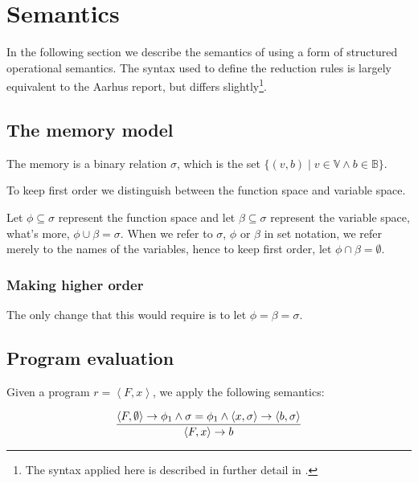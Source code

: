 \section{Semantics}\label{section:d-sos}

In the following section we describe the semantics of \D{} using a form of
structured operational semantics. The syntax used to define the reduction rules
is largely equivalent to the Aarhus report\cite{sos}, but differs
slightly\footnote{The syntax applied here is described in further detail in
.}.

\subsection{The memory model}\label{section:d-semantics-memory}

\begin{definition}\label{definition:memory} The memory is a binary relation
$\sigma$, which is the set $\{(v,b)\mid v\in\mathbb{V} \wedge
b\in\mathbb{B}\}$.\end{definition}

To keep \D{} first order we distinguish between the function space and variable
space.

\begin{definition} Let $\phi\subseteq\sigma$ represent the function space and
let $\beta\subseteq\sigma$ represent the variable space, what's more,
$\phi\cup\beta=\sigma$. When we refer to $\sigma$, $\phi$ or $\beta$ in set
notation, we refer merely to the names of the variables, hence to keep \D{}
first order, let $\phi\cap\beta=\emptyset$.\end{definition}

\subsubsection{Making \D{} higher order}

The only change that this would require is to let $\phi=\beta=\sigma$.

\subsection{Program evaluation}

Given a program $r=\left\langle F,x \right\rangle$, we apply the following
semantics:

\begin{equation}\label{sem:declaration}
{\displaystyle
    \left\langle F,\emptyset\right\rangle
    \rightarrow
    \phi_1
  \wedge
    \sigma=\phi_1
  \wedge
    \left\langle x,\sigma\right\rangle
    \rightarrow
    \left\langle b,\sigma\right\rangle
\over\displaystyle
  \left\langle F, x\right\rangle
  \rightarrow
  b
}
\end{equation}

